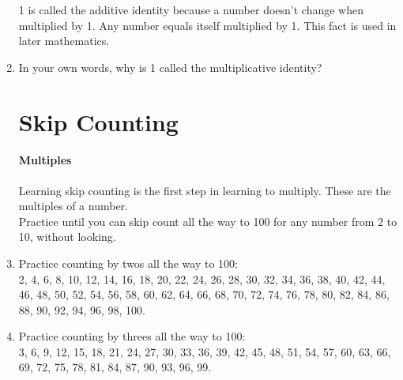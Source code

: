 \documentclass[12pt]{article}
\begin{document}
\begin{enumerate}
1 is called the additive identity because a number doesn’t change when multiplied by 1. Any number equals itself multiplied by 1. This fact is used in later mathematics.

\item In your own words, why is 1 called the multiplicative identity?

\section*{Skip Counting}
\paragraph{Multiples}
Learning skip counting is the first step in learning to multiply. These are the multiples of a number.\\

Practice until you can skip count all the way to 100 for any number from 2 to 10,  without looking.\\

\item Practice counting by twos all the way to 100:\\
2, 4, 6, 8, 10, 12, 14, 16, 18, 20, 22, 24, 26, 28, 30, 32, 34, 36, 38, 40, 42, 44, 46, 48, 50, 52, 54, 56, 58, 60, 62, 64, 66, 68, 70, 72, 74, 76, 78, 80, 82, 84, 86, 88, 90, 92, 94, 96, 98, 100.

\begin{center}
\end{center}

\item Practice counting by threes all the way to 100:\\
3, 6, 9, 12, 15, 18, 21, 24, 27, 30, 33, 36, 39, 42, 45, 48, 51, 54, 57, 60, 63, 66, 69, 72, 75, 78, 81, 84, 87, 90, 93, 96, 99.

\begin{center}
\end{center}


\end{enumerate}
\end{document}
